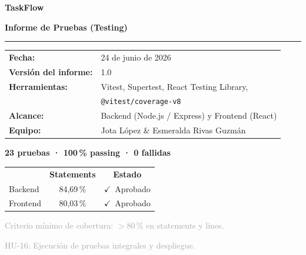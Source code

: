 \documentclass[12pt, a4paper]{article}
\newcommand{\ok}{\textcolor{accentgreen}{$\checkmark$}}
\begin{document}
\begin{titlepage}
  \centering
  \vspace*{2cm}
  {\huge\bfseries\color{primary} TaskFlow\par}
  \vspace{0.4cm}
  {\LARGE\bfseries Informe de Pruebas (Testing)\par}
  \vspace{0.8cm}
  \textcolor{bordercolor}{\rule{0.6\linewidth}{0.8pt}}\par
  \vspace{1cm}

  \begin{mdframed}[
    backgroundcolor=sectionbg,
    linecolor=bordercolor,
    linewidth=1pt,
    innerleftmargin=20pt, innerrightmargin=20pt,
    innertopmargin=14pt, innerbottommargin=14pt
  ]
  \begin{tabular}{@{}ll}
    \textbf{Fecha:}               & 24 de junio de 2026 \\[4pt]
    \textbf{Versión del informe:} & 1.0 \\[4pt]
    \textbf{Herramientas:}        & Vitest, Supertest, React Testing Library, \\
                                  & \texttt{@vitest/coverage-v8} \\[4pt]
    \textbf{Alcance:}             & Backend (Node.js / Express) y Frontend (React) \\[4pt]
    \textbf{Equipo:}              & Jota López \& Esmeralda Rivas Guzmán \\
  \end{tabular}
  \end{mdframed}

  \vspace{1.5cm}

  \begin{mdframed}[
    backgroundcolor=coverok,
    linecolor=accentgreen,
    linewidth=1.5pt,
    innerleftmargin=16pt, innerrightmargin=16pt,
    innertopmargin=12pt, innerbottommargin=12pt
  ]
  \centering
  {\large\bfseries\color{accentgreen} 23 pruebas · 100\,\% passing · 0 fallidas}\par
  \vspace{0.4em}
  \begin{tabular}{lcc}
    & \textbf{Statements} & \textbf{Estado} \\
    Backend  & 84,69\,\% & \ok\ Aprobado \\
    Frontend & 80,03\,\% & \ok\ Aprobado \\
  \end{tabular}
  \end{mdframed}

  \vfill
  \textcolor{darkgray}{\small Criterio mínimo de cobertura: $>$80\,\% en statements y lines.\par
  HU-16: Ejecución de pruebas integrales y despliegue.}
\end{titlepage}
\end{document}
